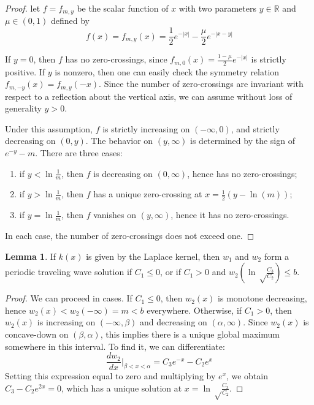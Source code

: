 \documentclass[11pt]{article}
\theoremstyle{definition}
\newtheorem{lem}[thm]{Lemma}
\numberwithin{equation}{section}
\numberwithin{thm}{section}
\begin{document}
\begin{proof}
let $f=f_{m,y}$ be the scalar function of $x$ with two parameters $y\in\mathbb R$ and $\mu\in(0,1)$ defined by
$$ f(x)= f_{m,y}(x) = \frac{1}{2} e^{-|x|} - \frac{\mu}{2}e^{-|x-y|} $$

If $y=0$, then $f$ has no zero-crossings, since $f_{m,0}(x)=\frac{1-\mu}{2}e^{-|x|}$ is strictly positive. If $y$ is nonzero, then one can easily check the symmetry relation $f_{m,-y}(x)=f_{m,y}(-x)$. Since the number of zero-crossings are invariant with respect to a reflection about the vertical axis, we can assume without loss of generality $y>0$.

Under this assumption, $f$ is strictly increasing on $(-\infty,0)$, and strictly decreasing on $(0,y)$. The behavior on $(y,\infty)$ is determined by the sign of $e^{-y}-m$. There are three cases:

\begin{enumerate}
\item if $y<\ln\frac{1}{m}$, then $f$ is decreasing on $(0,\infty)$, hence has no zero-crossings;
\item if $y>\ln\frac{1}{m}$, then $f$ has a unique zero-crossing at $x=\frac{1}{2}(y-\ln(m))$;
\item if $y=\ln\frac{1}{m}$, then $f$ vanishes on $(y,\infty)$, hence it has no zero-crossings.
\end{enumerate}
In each case, the number of zero-crossings does not exceed one.
\end{proof}

\begin{lem}
If $k(x)$ is given by the Laplace kernel, then $w_1$ and $w_2$ form a periodic traveling wave solution if $C_1\leq 0$, or if $C_1>0$ and $w_2\left(\ln\sqrt\frac{C_3}{C_2}\right)\leq b$.
\end{lem}

\begin{proof}
We can proceed in cases. If $C_1\leq 0$, then $w_2(x)$ is monotone decreasing, hence $w_2(x)<w_2(-\infty)=m<b$ everywhere. Otherwise, if $C_1>0$, then $w_2(x)$ is increasing on $(-\infty,\beta)$ and decreasing on $(\alpha,\infty)$. Since $w_2(x)$ is concave-down on $(\beta,\alpha)$, this implies there is a unique global maximum somewhere in this interval. To find it, we can differentiate:
$$ \frac{dw_2}{dx}\Big|_{\beta<x<\alpha}=C_3e^{-x}-C_2e^x $$
Setting this expression equal to zero and multiplying by $e^x$, we obtain $C_3-C_2e^{2x}=0$, which has a unique solution at $x=\ln\sqrt\frac{C_3}{C_2}$.
\end{proof}
\end{document}

